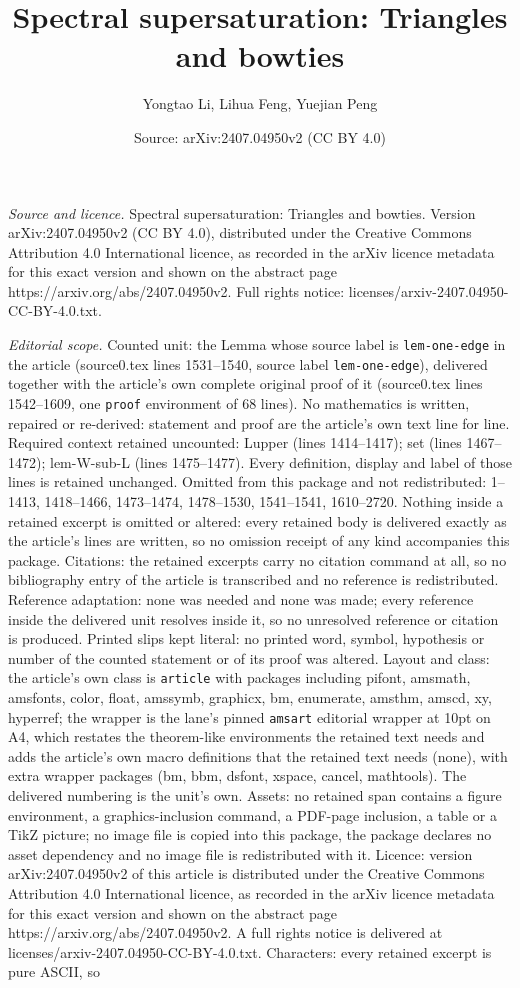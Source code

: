 \documentclass[10pt,a4paper]{amsart}
\title[Spectral supersaturation: Triangles and bowties]{Spectral supersaturation: Triangles and bowties}
\author{Yongtao Li, Lihua Feng, Yuejian Peng}
\date{Source: arXiv:2407.04950v2 (CC BY 4.0)}
\begin{document}
\maketitle

\noindent\emph{Source and licence.} Spectral supersaturation: Triangles and bowties. Version arXiv:2407.04950v2 (CC BY 4.0), distributed under the Creative Commons Attribution 4.0 International licence, as recorded in the arXiv licence metadata for this exact version and shown on the abstract page https://arxiv.org/abs/2407.04950v2. Full rights notice: licenses/arxiv-2407.04950-CC-BY-4.0.txt.\par\smallskip

\noindent\textit{Editorial scope.} Counted unit: the Lemma whose source label is \texttt{lem-one-edge} in the article (source0.tex lines 1531--1540, source label \texttt{lem-one-edge}), delivered together with the article's own complete original proof of it (source0.tex lines 1542--1609, one \texttt{proof} environment of 68 lines). No mathematics is written, repaired or re-derived: statement and proof are the article's own text line for line. Required context retained uncounted: Lupper (lines 1414--1417); set (lines 1467--1472); lem-W-sub-L (lines 1475--1477). Every definition, display and label of those lines is retained unchanged. Omitted from this package and not redistributed: 1--1413, 1418--1466, 1473--1474, 1478--1530, 1541--1541, 1610--2720. Nothing inside a retained excerpt is omitted or altered: every retained body is delivered exactly as the article's lines are written, so no omission receipt of any kind accompanies this package. Citations: the retained excerpts carry no citation command at all, so no bibliography entry of the article is transcribed and no reference is redistributed. Reference adaptation: none was needed and none was made; every reference inside the delivered unit resolves inside it, so no unresolved reference or citation is produced. Printed slips kept literal: no printed word, symbol, hypothesis or number of the counted statement or of its proof was altered. Layout and class: the article's own class is \texttt{article} with packages including pifont, amsmath, amsfonts, color, float, amssymb, graphicx, bm, enumerate, amsthm, amscd, xy, hyperref; the wrapper is the lane's pinned \texttt{amsart} editorial wrapper at 10pt on A4, which restates the theorem-like environments the retained text needs and adds the article's own macro definitions that the retained text needs (none), with extra wrapper packages (bm, bbm, dsfont, xspace, cancel, mathtools). The delivered numbering is the unit's own. Assets: no retained span contains a figure environment, a graphics-inclusion command, a PDF-page inclusion, a table or a TikZ picture; no image file is copied into this package, the package declares no asset dependency and no image file is redistributed with it. Licence: version arXiv:2407.04950v2 of this article is distributed under the Creative Commons Attribution 4.0 International licence, as recorded in the arXiv licence metadata for this exact version and shown on the abstract page https://arxiv.org/abs/2407.04950v2. A full rights notice is delivered at licenses/arxiv-2407.04950-CC-BY-4.0.txt. Characters: every retained excerpt is pure ASCII, so 
\end{document}

